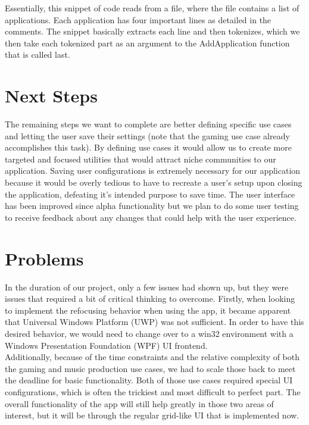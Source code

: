 \documentclass[fullpage, 10pt, onecolumn, draftclsnofoot]{IEEEtran}
\begin{document}
Essentially, this snippet of code reads from a file, where the file contains a list of applications.  Each application has four important lines as detailed in the comments.  The snippet basically extracts each line and then tokenizes, which we then take each tokenized part as an argument to the AddApplication function that is called last.


\section{Next Steps}
The remaining steps we want to complete are better defining specific use cases and letting the user save their settings (note that the gaming use case already accomplishes this task).  By defining use cases it would allow us to create more targeted and focused utilities that would attract niche communities to our application.  Saving user configurations is extremely necessary for our application because it would be overly tedious to have to recreate a user's setup upon closing the application, defeating it's intended purpose to save time.  The user interface has been improved since alpha functionality but we plan to do some user testing to receive feedback about any changes that could help with the user experience.  

\section{Problems} 
    In the duration of our project, only a few issues had shown up, but they were issues that required a bit of critical thinking to overcome. Firstly, when looking to implement the refocusing behavior when using the app, it became apparent that Universal Windows Platform (UWP) was not sufficient. In order to have this desired behavior, we would need to change over to a win32 environment with a Windows Presentation Foundation (WPF) UI frontend.\\ %
    \newline
    \indent Additionally, because of the time constraints and the relative complexity of both the gaming and music production use cases, we had to scale those back to meet the deadline for basic functionality. Both of those use cases required special UI configurations, which is often the trickiest and most difficult to perfect part. The overall functionality of the app will still help greatly in those two areas of interest, but it will be through the regular grid-like UI that is implemented now.
\end{document}
